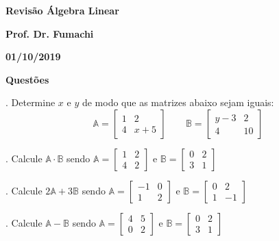 \documentclass{article}
\begin{document}
\pagestyle{empty}

\begin{center}\textbf{\Large{Revisão Álgebra Linear}}\end{center}
\begin{center}\textbf{\Large{Prof. Dr. Fumachi}}\end{center}
\begin{center}\textbf{\Large{01/10/2019}}\end{center}

\textbf{{Questões}}

\vspace{0.25 cm}
. Determine $x$ e $y$ de modo que as matrizes abaixo sejam iguais:
\begin{equation*}\label{key}
\mathbb{A} = \left[ \begin{matrix} 1&2 \\ 4&x+5 \end{matrix} \right] \qquad \mathbb{B} = \left[ \begin{matrix} y-3&2 \\ 4&10 \end{matrix} \right]
\end{equation*}

. Calcule $\mathbb{A} \cdot \mathbb{B}$ sendo $\mathbb{A} = \left[ \begin{matrix} 1&2 \\ 4&2 \end{matrix} \right]$ e $\mathbb{B} = \left[ \begin{matrix} 0&2 \\ 3&1 \end{matrix} \right]$

. Calcule $2 \mathbb{A} +3 \mathbb{B}$ sendo $\mathbb{A} = \left[ \begin{matrix} -1&0 \\ 1&2 \end{matrix} \right]$ e $\mathbb{B} = \left[ \begin{matrix} 0&2 \\ 1&-1 \end{matrix} \right]$

. Calcule $\mathbb{A} - \mathbb{B}$ sendo $\mathbb{A} = \left[ \begin{matrix} 4&5 \\ 0&2 \end{matrix} \right]$ e $\mathbb{B} = \left[ \begin{matrix} 0&2 \\ 3&1 \end{matrix} \right]$
\end{document}
